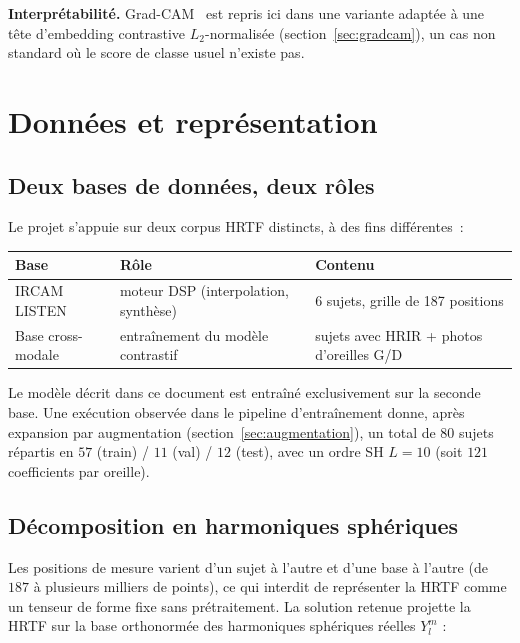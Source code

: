 \documentclass[12pt, a4paper]{article}
\begin{document}
\textbf{Interprétabilité.} Grad-CAM~\cite{Selvaraju17} est repris ici dans
une variante adaptée à une tête d'embedding contrastive $L_2$-normalisée
(section~\ref{sec:gradcam}), un cas non standard où le score de classe
usuel n'existe pas.

\section{Données et représentation}

\subsection{Deux bases de données, deux rôles}

Le projet s'appuie sur deux corpus HRTF distincts, à des fins différentes~:

\begin{center}
\begin{tabular}{lll}
\toprule
Base & Rôle & Contenu \\
\midrule
IRCAM LISTEN & moteur DSP (interpolation, synthèse) & 6 sujets, grille de 187 positions \\
Base cross-modale\footnotemark & entraînement du modèle contrastif & sujets avec HRIR + photos d'oreilles G/D \\
\bottomrule
\end{tabular}
\end{center}

Le modèle décrit dans ce document est entraîné exclusivement sur la seconde
base. Une exécution observée dans le pipeline d'entraînement donne, après
expansion par augmentation (section~\ref{sec:augmentation}), un total de
$80$ sujets répartis en $57$ (train) / $11$ (val) / $12$ (test), avec un
ordre SH $L=10$ (soit $121$ coefficients par oreille).

\subsection{Décomposition en harmoniques sphériques}
\label{sec:sh}

Les positions de mesure varient d'un sujet à l'autre et d'une base à
l'autre (de $187$ à plusieurs milliers de points), ce qui interdit de
représenter la HRTF comme un tenseur de forme fixe sans prétraitement. La
solution retenue projette la HRTF sur la base orthonormée des harmoniques
sphériques réelles $Y_l^m$ :
\end{document}
